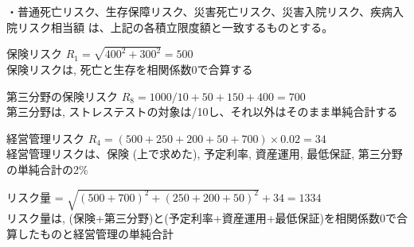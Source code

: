 \documentclass[report,gutter=10mm,fore-edge=10mm,uplatex,dvipdfmx]{jlreq}
\begin{document}
・普通死亡リスク、生存保障リスク、災害死亡リスク、災害入院リスク、疾病入院リスク相当額
は、上記の各積立限度額と一致するものとする。

\answer{}

保険リスク $R_1=\sqrt{400^2+300^2}=500$\\
保険リスクは, 死亡と生存を相関係数0で合算する

第三分野の保険リスク $R_8=1000/10+50+150+400=700$\\
第三分野は, ストレステストの対象は/10し、それ以外はそのまま単純合計する

経営管理リスク $R_4=(500+250+200+50+700)\times 0.02=34$\\
経営管理リスクは、保険 (上で求めた), 予定利率, 資産運用, 最低保証, 第三分野の単純合計の2\% 

リスク量 = $\sqrt{(500+700)^2+(250+200+50)^2}+34=1334$\\
リスク量は, (保険+第三分野)と(予定利率+資産運用+最低保証)を相関係数0で合算したものと経営管理の単純合計
\end{document}
